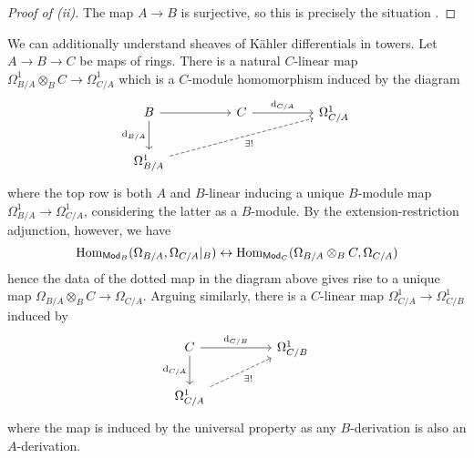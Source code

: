 \begin{proof}[Proof of (ii)]
    The map $A\to B$ is surjective, so this is precisely the situation . 
\end{proof}
We can additionally understand sheaves of K\"{a}hler differentials in towers. Let $A\to B\to C$ be maps of rings. There is a natural $C$-linear map $\Omega^{1}_{B/A}\otimes_{B}C\to\Omega_{C/A}^{1}$ which is a $C$-module homomorphism induced by the diagram 
$$%
\begin{tikzcd}
	B && C && {\Omega_{C/A}^{1}} \\
	{\Omega_{B/A}^{1}}
	\arrow[from=1-1, to=1-3]
	\arrow["{\dform_{B/A}}"', from=1-1, to=2-1]
	\arrow["{\dform_{C/A}}", from=1-3, to=1-5]
	\arrow["{\exists!}"', dashed, from=2-1, to=1-5]
\end{tikzcd}$$
where the top row is both $A$ and $B$-linear inducing a unique $B$-module map $\Omega_{B/A}^{1}\to\Omega_{C/A}^{1}$, considering the latter as a $B$-module. By the extension-restriction adjunction, however, we have 
$$\mathrm{Hom}_{\mathsf{Mod}_{B}}(\Omega_{B/A},\Omega_{C/A}|_{B})\leftrightarrow\mathrm{Hom}_{\mathsf{Mod}_{C}}(\Omega_{B/A}\otimes_{B}C,\Omega_{C/A})$$
hence the data of the dotted map in the diagram above gives rise to a unique map $\Omega_{B/A}\otimes_{B}C\to\Omega_{C/A}$. Arguing similarly, there is a $C$-linear map $\Omega^{1}_{C/A}\to\Omega_{C/B}^{1}$ induced by 
$$%
\begin{tikzcd}
	C && {\Omega_{C/B}^{1}} \\
	{\Omega_{C/A}^{1}}
	\arrow["{\dform_{C/B}}", from=1-1, to=1-3]
	\arrow["{\dform_{C/A}}"', from=1-1, to=2-1]
	\arrow["{\exists!}"', dashed, from=2-1, to=1-3]
\end{tikzcd}$$
where the map is induced by the universal property as any $B$-derivation is also an $A$-derivation. 

